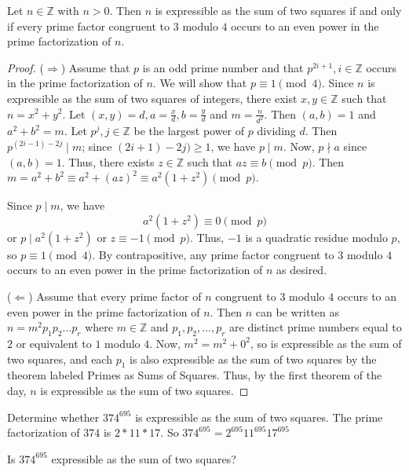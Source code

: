 \documentclass[letterpaper, 11 pt]{article}
\begin{document}
\begin{thm}[Theorem 10.3]
Let $n\in\mathbb{Z}$ with $n>0$. Then $n$ is expressible as the sum of two squares if and only if every prime factor congruent to $3$ modulo  $4$ occurs to an even power in the prime factorization of $n$.
\end{thm}
\begin{proof}
 ($\Rightarrow$) Assume that $p$ is an odd prime number and that $p^{2i+1},i\in\mathbb{Z}$ occurs in the prime factorization of $n$. We will show that $p\equiv 1 \pmod 4$. Since $n$ is expressible as the sum of two squares of integers, there exist $x,y\in\mathbb{Z}$ such that $n=x^2+y^2.$ Let $(x,y)=d, a=\frac{x}{d},b=\frac{y}{d}$ and  $m=\frac{n}{d^2}$. Then $(a,b)=1$ and $a^2+b^2=m$. Let $p^j,j\in\mathbb{Z}$ be the largest power of $p$ dividing $d$. Then $p^{(2i-1)-2j}\mid m$; since $(2i+1)-2j)\geq 1$, we have $p\mid m$. Now, $p\nmid a$ since $(a,b)=1$. Thus, there exists $z\in\mathbb{Z}$ such that $az\equiv b \pmod p$. Then $m=a^2+b^2\equiv a^2+(az)^2\equiv a^2(1+z^2)\pmod p$.
 
 Since $p\mid m$, we have \[a^2(1+z^2)\equiv 0\pmod p\] or $p\mid a^2(1+z^2)$ or $z\equiv -1 \pmod p$. Thus, $-1$ is a quadratic residue modulo $p$, so $p\equiv 1 \pmod 4$. By contrapositive, any prime factor congruent to $3$ modulo $4$ occurs to an even power in the prime factorization of $n$ as desired.
 
 ($\Leftarrow$) Assume that every prime factor of $n$ congruent to $3$ modulo $4$ occurs to an even power in the prime factorization of $n$. Then $n$ can be written as $n=m^2p_1p_2\dots  p_r$ where $m\in\mathbb{Z}$ and $p_1,p_2,\dots,p_r$ are distinct prime numbers equal to $2$ or equivalent to $1$ modulo $4$. Now, $m^2=m^2+0^2$, so is expressible as the sum of two squares, and each $p_1$ is also expressible as the sum of two squares by the theorem labeled Primes as Sums of Squares. Thus, by the first theorem of the day, $n$ is expressible as the sum of two squares.
\end{proof}


\begin{example}
 Determine whether $374^{695}$ is expressible as the sum of two squares. The prime factorization of $374$ is $2*11*17$. So $374^{695}=2^{695}11^{695}17^{695}$ 
 
 
\begin{poll}
 Is $374^{695}$ expressible as the sum of two squares?
\end{poll}
\end{example}
\end{document}
